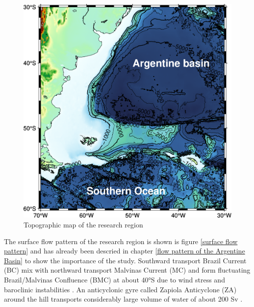 \begin{figure}[hbtp]
  \centering
  \includegraphics[width=15cm]{chapter/figure/research area topography map_earth.png}
  \caption
  {Topographic map of the research region}
  \label{research topography}
\end{figure}

The surface flow pattern of the research region is shown is figure \ref{surface flow pattern} and has already been descried in chapter \ref{flow pattern of the Argentine Basin} to show the importance of the study. Southward transport Brazil Current (BC) mix with northward transport Malvinas Current (MC) and form fluctuating Brazil/Malvinas Confluence (BMC) at about 40°S due to wind stress and baroclinic instabilities \cite{jullion2010circulation,weijer2015eddy}. An anticyclonic gyre called Zapiola Anticyclone (ZA) around the hill transports considerably large volume of water of about 200 Sv \cite{saunders1995bottom}. 

